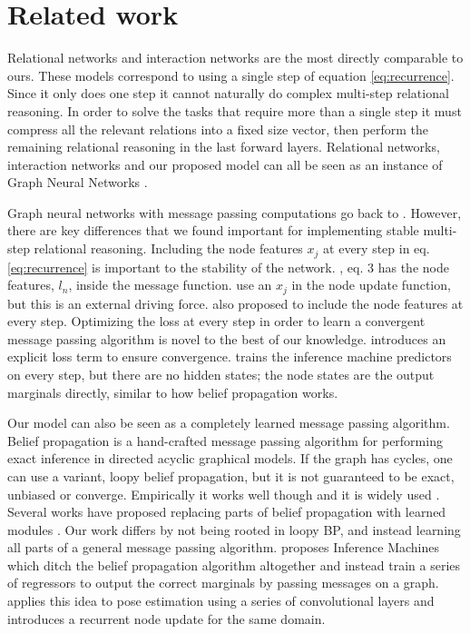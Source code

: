 \documentclass{article}
\begin{document}
\section{Related work} \label{related}
Relational networks \citep{santoro2017simple} and interaction networks \citep{battaglia2016interaction} are the most directly comparable to ours.
These models correspond to using a single step of equation \ref{eq:recurrence}.
Since it only does one step it cannot naturally do complex multi-step relational reasoning.
In order to solve the tasks that require more than a single step it must compress all the relevant relations into a fixed size vector, then perform the remaining relational reasoning in the last forward layers.
Relational networks, interaction networks and our proposed model can all be seen as an instance of Graph Neural Networks \citep{scarselli2009graph,gilmer2017neural}.

Graph neural networks with message passing computations go back to \cite{scarselli2009graph}. However, there are key differences that we found important for implementing stable multi-step relational reasoning. Including the node features $x_j$ at every step in eq. \ref{eq:recurrence} is important to the stability of the network. \cite{scarselli2009graph}, eq. 3 has the node features, $l_n$, inside the message function. \citet{battaglia2016interaction} use an $x_j$ in the node update function, but this is an external driving force. \citet{sukhbaatar2016learning} also proposed to include the node features at every step.
Optimizing the loss at every step in order to learn a convergent message passing algorithm is novel to the best of our knowledge. \cite{scarselli2009graph} introduces an explicit loss term to ensure convergence. \citet{ross2011learning} trains the inference machine predictors on every step, but there are no hidden states; the node states are the output marginals directly, similar to how belief propagation works.

Our model can also be seen as a completely learned message passing algorithm.
Belief propagation is a hand-crafted message passing algorithm for performing exact inference in directed acyclic graphical models.
If the graph has cycles, one can use a variant, loopy belief propagation, but it is not guaranteed to be exact, unbiased or converge.
Empirically it works well though and it is widely used \citep{murphy1999loopy}.
Several works have proposed replacing parts of belief propagation with learned modules \citep{heess2013learning, lin2015deeply}.
Our work differs by not being rooted in loopy BP, and instead learning all parts of a general message passing algorithm.
\citet{ross2011learning} proposes Inference Machines which ditch the belief propagation algorithm altogether and instead train a series of regressors to output the correct marginals by passing messages on a graph.
\citet{wei2016convolutional} applies this idea to pose estimation using a series of convolutional layers and \citet{deng2016structure} introduces a recurrent node update for the same domain.
\end{document}
